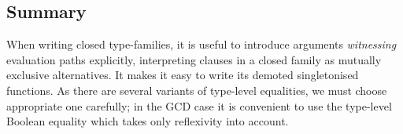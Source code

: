 \documentclass[demotion-paper.tex]{subfiles}
\begin{document}
\subsection{Summary}
When writing closed type-families, it is useful to introduce arguments \emph{witnessing} evaluation paths explicitly, interpreting clauses in a closed family as mutually exclusive alternatives.
It makes it easy to write its demoted singletonised functions.
As there are several variants of type-level equalities, we must choose appropriate one carefully; in the GCD case it is convenient to use the type-level Boolean equality which takes only reflexivity into account.
\end{document}

